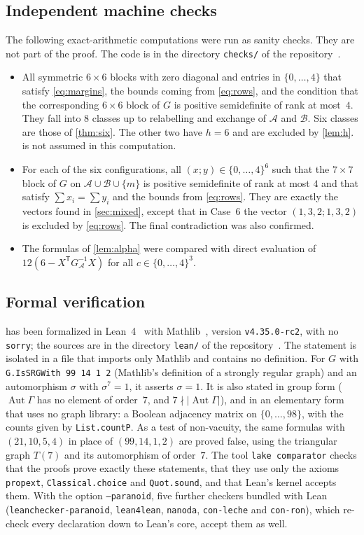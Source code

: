 \documentclass[11pt,a4paper]{amsart}
\theoremstyle{definition}
\theoremstyle{remark}
\newcommand{\cA}{\mathcal{A}}
\newcommand{\cB}{\mathcal{B}}
\newcommand{\T}{\mathsf{T}}
\DeclareMathOperator{\Aut}{Aut}
\begin{document}
\subsection*{Independent machine checks}
The following exact-arithmetic computations were run as sanity checks. They are not part of the proof. The
code is in the directory \texttt{checks/} of the repository~\cite{Repo}.
\begin{itemize}[leftmargin=2em]
\item All symmetric $6\times6$ blocks with zero diagonal and entries in $\{0,\dots,4\}$ that satisfy
\eqref{eq:margins}, the bounds coming from \eqref{eq:rows}, and the condition that the corresponding $6\times6$
block of $G$ is positive semidefinite of rank at most~$4$. They fall into $8$ classes up to relabelling
and exchange of $\cA$ and $\cB$. Six classes are those of \cref{thm:six}. The other two have $h=6$
and are excluded by \cref{lem:h}.  is not assumed in this computation.
\item For each of the six configurations, all $(x;y)\in\{0,\dots,4\}^6$ such that the $7\times7$ block of $G$
on $\cA\cup\cB\cup\{m\}$ is positive semidefinite of rank at most $4$ and that satisfy $\sum x_i=\sum y_i$ and the
bounds from \eqref{eq:rows}. They are exactly the vectors found in \cref{sec:mixed}, except that in Case~6 the
vector $(1,3,2;1,3,2)$ is excluded by \eqref{eq:rows}. The final contradiction was also confirmed.
\item The formulas of \cref{lem:alpha} were compared with direct evaluation of $12(6-X^{\T}G_\cA^{-1}X)$ for all
$c\in\{0,\dots,4\}^3$.
\end{itemize}

\subsection*{Formal verification}
 has been formalized in Lean~4~\cite{dMU21} with Mathlib~\cite{Mat20}, version
\texttt{v4.35.0-rc2}, with no \texttt{sorry}; the sources are in the directory \texttt{lean/} of the
repository~\cite{Repo}. The statement is isolated in a file that imports only Mathlib and contains no definition.
For $G$ with \texttt{G.IsSRGWith 99 14 1 2} (Mathlib's definition of a strongly regular graph) and an
automorphism $\sigma$ with $\sigma^7=1$, it asserts $\sigma=1$. It is also stated in group form ($\Aut\Gamma$ has no
element of order~$7$, and $7\nmid|\Aut\Gamma|$), and in an elementary form that uses no graph library: a Boolean
adjacency matrix on $\{0,\dots,98\}$, with the counts given by \texttt{List.countP}. As a test of non-vacuity, the
same formulas with $(21,10,5,4)$ in place of $(99,14,1,2)$ are proved false, using the triangular graph $T(7)$ and
its automorphism of order~$7$. The tool \texttt{lake comparator} checks that the proofs prove exactly these
statements, that they use only the axioms \texttt{propext}, \texttt{Classical.choice} and \texttt{Quot.sound}, and
that Lean's kernel accepts them. With the option \texttt{--paranoid}, five further checkers bundled with Lean
(\texttt{leanchecker-paranoid}, \texttt{lean4lean}, \texttt{nanoda}, \texttt{con-leche} and \texttt{con-ron}),
which re-check every declaration down to Lean's core, accept them as well.
\end{document}
